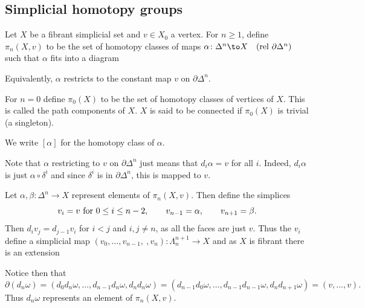 \subsection{Simplicial homotopy groups}

\bdefn

    Let $X$ be a fibrant simplicial set and $v\in X_0$ a vertex.
    For $n\geq1$, define $\pi_n(X,v)$ to be the set of homotopy classes of maps
    $\alpha\colon\Delta^n\to X\hrel{\partial\Delta^n}$ such that $\alpha$ fits into a diagram

    \centerline{}

    Equivalently, $\alpha$ restricts to the constant map $v$ on $\partial\Delta^n$.

    For $n=0$ define $\pi_0(X)$ to be the set of homotopy classes of vertices of $X$.
    This is called the {\emphcolor path components} of $X$.
    $X$ is said to be {\emphcolor connected} if $\pi_0(X)$ is trivial (a singleton).

    We write $[\alpha]$ for the homotopy class of $\alpha$.

\edefn

Note that $\alpha$ restricting to $v$ on $\partial\Delta^n$ just means that $d_i\alpha=v$ for all $i$.
Indeed, $d_i\alpha$ is just $\alpha\circ\delta^i$ and since $\delta^i$ is in $\partial\Delta^n$, this is mapped to $v$.

Let $\alpha,\beta\colon\Delta^n\to X$ represent elements of $\pi_n(X,v)$.
Then define the simplices
$$ v_i=v\hbox{ for $0\leq i\leq n-2$},\qquad v_{n-1}=\alpha,\qquad v_{n+1}=\beta . $$
Then $d_iv_j=d_{j-1}v_i$ for $i<j$ and $i,j\neq n$, as all the faces are just $v$.
Thus the $v_i$ define a simplicial map $(v_0,\dots,v_{n-1},\ ,v_n)\colon\Lambda^{n+1}_n\to X$ and as $X$ is fibrant
there is an extension

\centerline{}

Notice then that
$$ \partial(d_n\omega) = (d_0d_n\omega,\dots,d_{n-1}d_n\omega,d_nd_n\omega) =
(d_{n-1}d_0\omega,\dots,d_{n-1}d_{n-1}\omega,d_nd_{n+1}\omega) = (v,\dots,v) . $$
Thus $d_n\omega$ represents an element of $\pi_n(X,v)$.

